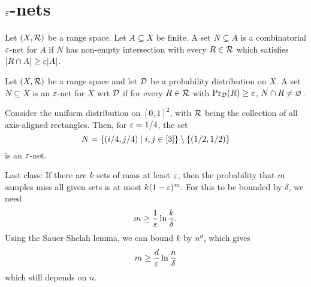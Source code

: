 \section{$\varepsilon$-nets} \label{sec:eps-nets}

\begin{definition}
    Let $(X, \mathcal{R})$ be a range space.
    Let $A \subseteq X$ be finite.
    A set $N \subseteq A$ is a combinatorial $\varepsilon$-net for $A$ if
    $N$ has non-empty intersection with every $R \in \mathcal{R}$ which satisfies
    $\lvert R \cap A\rvert \ge \varepsilon \lvert A\rvert$.
\end{definition}

\begin{definition}
    Let $(X, \mathcal{R})$ be a range space and let $\mathcal{D}$ be a probability
    distribution on $X$.
    A set $N \subseteq X$ is an $\varepsilon$-net for $X$ wrt $\mathcal{D}$ if
    for every $R \in \mathcal{R}$ with $\Pr_{\mathcal{D}}(R) \ge \varepsilon$,
    $N \cap R \ne \varnothing$.
\end{definition}
\begin{example}
    Consider the uniform distribution on $[0, 1]^2$, with $\mathcal{R}$ being the
    collection of all axis-aligned rectangles.
    Then, for $\varepsilon = 1/4$, the set \[
        N = \{(i/4, j/4) \mid i, j \in [3]\}
            \setminus \{(1/2, 1/2)\}
    \] is an $\varepsilon$-net.
\end{example}

Last class: If there are $k$ sets of mass at least $\varepsilon$,
then the probability that $m$ samples miss all given sets is at most
$k (1 - \varepsilon)^m$.
For this to be bounded by $\delta$, we need \[
    m \ge \frac1{\varepsilon} \ln \frac{k}{\delta}.
\] Using the Sauer-Shelah lemma, we can bound $k$ by $n^d$, which gives \[
    m \ge \frac{d}{\varepsilon} \ln \frac{n}{\delta}
\] which still depends on $n$.


